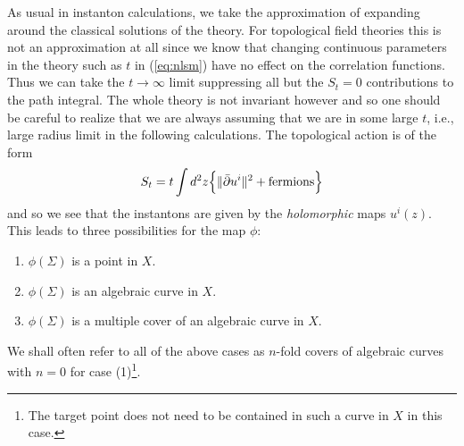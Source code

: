 As usual in instanton calculations, we take the approximation of
expanding around the classical solutions of the theory. For
topological field theories this is not an approximation at all since
we know that changing continuous parameters in the theory such as $t$
in (\ref{eq:nlsm}) have no effect on the correlation functions. Thus
we can take the $t\to\infty$ limit suppressing all but the $S_t=0$
contributions to the path integral. The whole theory is not invariant
however and so one should be careful to realize that we
are always assuming that we are in
some large $t$, i.e., large radius limit in the following
calculations.
The topological action is of the form
\begin{equation}
  S_t=t\int d^2z\Big\{\|\bar\partial u^i\|^2 + \hbox{fermions}\Big\}
\end{equation}
and so we see that the instantons are given by the {\em holomorphic\/}
maps $u^i(z)$. This leads to three possibilities for the map $\phi$:
\begin{enumerate}
  \item $\phi(\Sigma)$ is a point in $X$.
  \item $\phi(\Sigma)$ is an algebraic curve in $X$.
  \item $\phi(\Sigma)$ is a multiple cover of an algebraic curve in
	$X$.
\end{enumerate}
We shall often refer to all of the above cases as $n$-fold covers
of algebraic curves with $n=0$ for case
(1)\footnote{The target point does not need to be contained in such a curve
in $X$ in this case.}.

